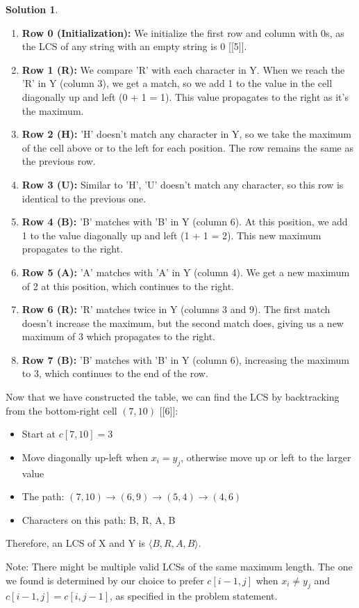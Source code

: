 \documentclass{article}
\theoremstyle{definition}
\newtheorem*{solution}{Solution}
\begin{document}
\begin{solution}
\begin{enumerate}
    \item \textbf{Row 0 (Initialization):} We initialize the first row and column with 0s, as the LCS of any string with an empty string is 0 [[5]].
    
    \item \textbf{Row 1 (R):} We compare 'R' with each character in Y. When we reach the 'R' in Y (column 3), we get a match, so we add 1 to the value in the cell diagonally up and left (0 + 1 = 1). This value propagates to the right as it's the maximum.
    
    \item \textbf{Row 2 (H):} 'H' doesn't match any character in Y, so we take the maximum of the cell above or to the left for each position. The row remains the same as the previous row.
    
    \item \textbf{Row 3 (U):} Similar to 'H', 'U' doesn't match any character, so this row is identical to the previous one.
    
    \item \textbf{Row 4 (B):} 'B' matches with 'B' in Y (column 6). At this position, we add 1 to the value diagonally up and left (1 + 1 = 2). This new maximum propagates to the right.
    
    \item \textbf{Row 5 (A):} 'A' matches with 'A' in Y (column 4). We get a new maximum of 2 at this position, which continues to the right.
    
    \item \textbf{Row 6 (R):} 'R' matches twice in Y (columns 3 and 9). The first match doesn't increase the maximum, but the second match does, giving us a new maximum of 3 which propagates to the right.
    
    \item \textbf{Row 7 (B):} 'B' matches with 'B' in Y (column 6), increasing the maximum to 3, which continues to the end of the row.
\end{enumerate}

Now that we have constructed the table, we can find the LCS by backtracking from the bottom-right cell $(7,10)$ [[6]]:

\begin{itemize}
    \item Start at $c[7,10] = 3$
    \item Move diagonally up-left when $x_i = y_j$, otherwise move up or left to the larger value
    \item The path: $(7,10) \rightarrow (6,9) \rightarrow (5,4) \rightarrow (4,6)$
    \item Characters on this path: B, R, A, B
\end{itemize}

Therefore, an LCS of X and Y is $\langle B,R,A,B \rangle$.

Note: There might be multiple valid LCSs of the same maximum length. The one we found is determined by our choice to prefer $c[i-1,j]$ when $x_i \neq y_j$ and $c[i-1,j] = c[i,j-1]$, as specified in the problem statement.
\end{solution}
  
\end{document}
